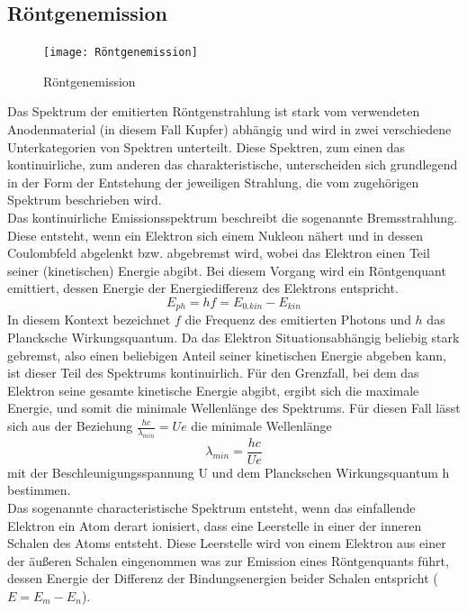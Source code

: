 \subsection{Röntgenemission}
\begin{figure}[h]
    \centering
    \texttt{[image: Röntgenemission]}
    \caption{Röntgenemission}
\end{figure}
Das Spektrum der emitierten Röntgenstrahlung ist stark vom verwendeten Anodenmaterial (in diesem Fall Kupfer) abhängig und wird in zwei verschiedene Unterkategorien von Spektren unterteilt. Diese Spektren, zum einen das kontinuirliche, zum anderen das charakteristische, unterscheiden sich grundlegend in der Form der Entstehung der jeweiligen Strahlung, die vom zugehörigen Spektrum beschrieben wird. \\
Das kontinuirliche Emissionsspektrum beschreibt die sogenannte Bremsstrahlung. Diese entsteht, wenn ein Elektron sich einem Nukleon nähert und in dessen Coulombfeld abgelenkt bzw. abgebremst wird, wobei das Elektron einen Teil seiner (kinetischen) Energie abgibt. Bei diesem Vorgang wird ein Röntgenquant emittiert, dessen Energie der Energiedifferenz des Elektrons entspricht.
\begin{equation}
E_{ph}=hf=E_{0.kin}-E_{kin}
\end{equation}
In diesem Kontext bezeichnet $f$ die Frequenz des emitierten Photons und $h$ das Plancksche Wirkungsquantum. Da das Elektron Situationsabhängig beliebig stark gebremst, also einen beliebigen Anteil seiner kinetischen Energie abgeben kann, ist dieser Teil des Spektrums kontinuirlich. Für den Grenzfall, bei dem das Elektron seine gesamte kinetische Energie abgibt, ergibt sich die maximale Energie, und somit die minimale Wellenlänge des Spektrums. Für diesen Fall lässt sich aus der Beziehung $\frac{hc}{\lambda_{min}}=Ue$ die minimale Wellenlänge
\begin{equation}
\lambda_{min}=\frac{hc}{Ue}
\end{equation}
mit der Beschleunigungsspannung U und dem Planckschen Wirkungsquantum h bestimmen. \\
Das sogenannte characteristische Spektrum entsteht, wenn das einfallende Elektron ein Atom derart ionisiert, dass eine Leerstelle in einer der inneren Schalen des Atoms entsteht. Diese Leerstelle wird von einem Elektron aus einer der äußeren Schalen eingenommen was zur Emission eines Röntgenquants führt, dessen Energie der Differenz der Bindungsenergien beider Schalen entspricht ($E=E_m-E_n$). \\
